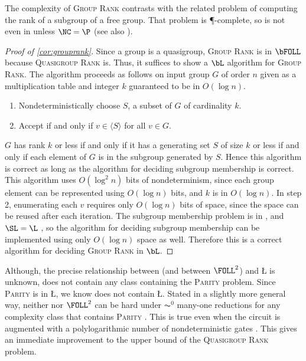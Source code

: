\documentclass{article}
\begin{document}
The complexity of \textsc{Group Rank} contrasts with the related problem of computing the rank of a subgroup of a free group.
That problem is \P-complete, so is not even in \NC{} unless $\NC = \P$ \autocite[Theorem~4.9]{am84} (see also \autocite[Problem~A.8.11]{ghr95}).

\begin{proof}[Proof of \autoref{cor:grouprank}]
  Since a group is a quasigroup, \textsc{Group Rank} is in $\bFOLL$ because \textsc{Quasigroup Rank} is.
  Thus, it suffices to show a $\bL$ algorithm for \textsc{Group Rank}.
  The algorithm proceeds as follows on input group $G$ of order $n$ given as a multiplication table and integer $k$ guaranteed to be in $O(\log n)$.
  \begin{enumerate}
  \item Nondeterministically choose $S$, a subset of $G$ of cardinality $k$.
  \item Accept if and only if $v \in \langle S \rangle$ for all $v \in G$.
  \end{enumerate}
  $G$ has rank $k$ or less if and only if it has a generating set $S$ of size $k$ or less if and only if each element of $G$ is in the subgroup generated by $S$.
  Hence this algorithm is correct as long as the algorithm for deciding subgroup membership is correct.
  This algorithm uses $O(\log^2 n)$ bits of nondeterminism, since each group element can be represented using $O(\log n)$ bits, and $k$ is in $O(\log n)$.
  In step 2, enumerating each $v$ requires only $O(\log n)$ bits of space, since the space can be reused after each iteration.
  The subgroup membership problem is in \SL{} \cite[Section~3]{bm89}, and $\SL = \L$ \cite{reingold08}, so the algorithm for deciding subgroup membership can be implemented using only $O(\log n)$ space as well.
  Therefore this is a correct algorithm for deciding \textsc{Group Rank} in $\bL$.
\end{proof}

Although, the precise relationship between \FOLL{} (and between $\FOLL^2$) and \L{} is unknown, \FOLL{} does not contain any class containing the \textsc{Parity} problem.
Since \textsc{Parity} is in \L, we know \FOLL{} does not contain \L.
Stated in a slightly more general way, neither \FOLL{} nor $\FOLL^2$ can be hard under $\AC^0$ many-one reductions for any complexity class that contains \textsc{Parity} \cite[Proposition~2.1]{bklm01}.
This is true even when the circuit is augmented with a polylogarithmic number of nondeterministic gates \cite[Section~4]{ctw13}.
This gives an immediate improvement to the upper bound of the \textsc{Quasigroup Rank} problem.
\end{document}
